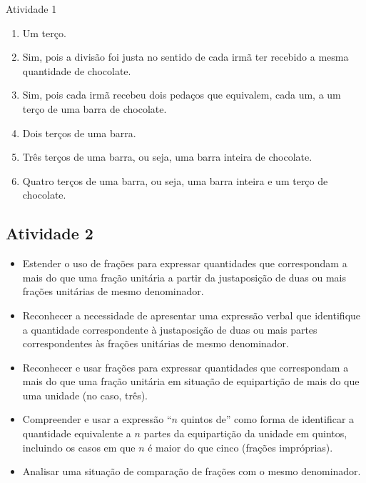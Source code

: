 \documentclass[oneside]{book}
\begin{document}
\begin{multicols}{2}
\begin{resposta*}{Atividade 1}
\begin{enumerate} [\quad a)] %
    \item       Um terço.
    \item       Sim, pois a divisão foi justa no sentido de cada irmã ter recebido a mesma quantidade de chocolate.
    \item       Sim, pois cada irmã recebeu dois pedaços que equivalem, cada um, a um terço de uma barra de chocolate.
    \item       Dois terços de uma barra.
    \item       Três terços de uma barra, ou seja, uma barra inteira de chocolate.
    \item       Quatro terços de uma barra, ou seja, uma barra inteira e um terço de chocolate.
\end{enumerate} %

\end{resposta*}


\subsection{Atividade 2}

   \vspace{.1cm}

  \begin{itemize} %
    \item       Estender o uso de frações para expressar quantidades que correspondam a mais do que uma fração unitária  a partir da justaposição de duas ou mais frações unitárias de mesmo denominador.
    \item       Reconhecer a necessidade de apresentar uma expressão verbal que identifique a quantidade correspondente à justaposição de duas ou mais partes correspondentes às frações unitárias de mesmo denominador.
    \item       Reconhecer e usar frações para expressar quantidades que correspondam a mais do que uma fração unitária em situação de equipartição de mais do que uma unidade (no caso, três).
    \item       Compreender e usar a expressão       ``$n$ quintos de''       como forma de identificar a quantidade equivalente a       $n$       partes da equipartição da unidade em quintos, incluindo os casos em que       $n$       é maior do que cinco (frações impróprias).
    \item       Analisar uma situação de comparação de frações com o mesmo denominador.
\end{itemize} %



\end{multicols}
\end{document}
